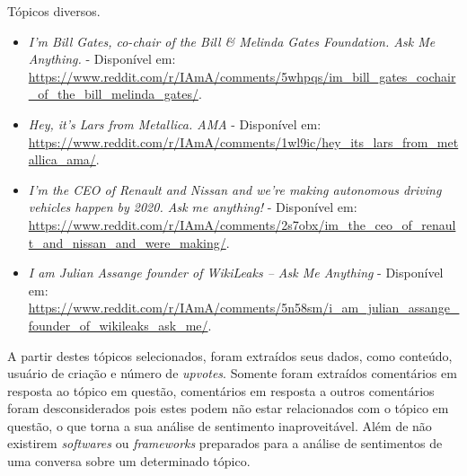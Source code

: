 Tópicos diversos.
\begin{itemize}
  \item
  \textit{I’m Bill Gates, co-chair of the Bill \& Melinda Gates Foundation. Ask
  Me Anything.} - Disponível em: \url{https://www.reddit.com/r/IAmA/comments/5whpqs/im_bill_gates_cochair_of_the_bill_melinda_gates/}.
  \item
  \textit{Hey, it's Lars from Metallica. AMA} - Disponível em: \url{https://www.reddit.com/r/IAmA/comments/1wl9ic/hey_its_lars_from_metallica_ama/}.
  
  \item
  \textit{I'm the CEO of Renault and Nissan and we're making autonomous driving vehicles happen by 2020. Ask me anything!} - Disponível em: \url{https://www.reddit.com/r/IAmA/comments/2s7obx/im_the_ceo_of_renault_and_nissan_and_were_making/}.
  
  \item
  \textit{I am Julian Assange founder of WikiLeaks -- Ask Me Anything} - Disponível em: \url{https://www.reddit.com/r/IAmA/comments/5n58sm/i_am_julian_assange_founder_of_wikileaks_ask_me/}.
  
\end{itemize}


A partir destes tópicos selecionados, foram extraídos seus dados, como conteúdo,
usuário de criação e número de \textit{upvotes}. Somente foram extraídos
comentários em resposta ao tópico em questão, comentários em resposta a outros
comentários foram desconsiderados pois estes podem não estar relacionados com o
tópico em questão, o que torna a sua análise de sentimento inaproveitável. Além
de não existirem \textit{softwares} ou \textit{frameworks} preparados para a
análise de sentimentos de uma conversa sobre um determinado tópico.
